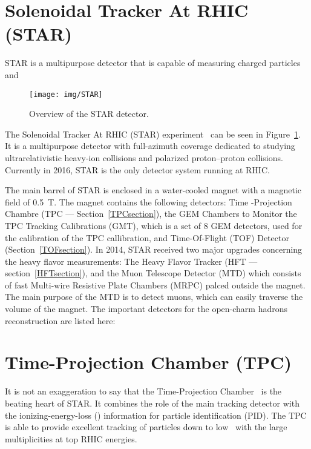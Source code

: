 \section{Solenoidal Tracker At RHIC (STAR)}

STAR is a multipurpose detector that is capable of measuring charged particles and 

\begin{figure}[htb]
\begin{center}
 \texttt{[image: img/STAR]}\\
\end{center}
\caption{\label{STAR}Overview of the STAR detector.}
\end{figure}

The Solenoidal Tracker At RHIC (STAR) experiment~\cite{STARoverview} can be seen in Figure~\ref{STAR}. It is a multipurpose detector with full-azimuth
coverage dedicated to
studying ultrarelativistic heavy-ion collisions and polarized proton--proton collisions. Currently in 2016, STAR is the
only detector system running at RHIC\@.

The main barrel of STAR is enclosed in a water-cooled magnet with a magnetic field of \SI{0.5}{\tesla}. The magnet contains the
following detectors: Time -Projection Chambre (TPC --- Section~\ref{TPCsection}), the GEM
Chambers to Monitor the TPC Tracking Calibrations (GMT), 
which is a set of 8 GEM detectors, used for the calibration of the TPC callibration, and Time-Of-Flight
(TOF) Detector (Section~\ref{TOFsection}). In 2014, STAR received two major upgrades
concerning the heavy flavor measurements: The Heavy Flavor Tracker (HFT --- section~\ref{HFTsection}), and the Muon Telescope Detector (MTD) which consists of fast Multi-wire Resistive Plate Chambers (MRPC) palced
outside the magnet. The main purpose of the MTD is to detect muons, which can easily traverse the volume of the magnet. The important
detectors for the open-charm hadrons reconstruction are listed here:

\section{Time-Projection Chamber (TPC)\label{TPCsection}} 
It is not an exaggeration to say that the Time-Projection Chamber~\cite{TpcNim} is the beating heart of STAR. It combines the role of the main tracking detector with the ionizing-energy-loss
(\dedx) information for particle identification (PID). The TPC is able to provide excellent tracking of particles down to low \pt\ with the large multiplicities at top RHIC energies.

